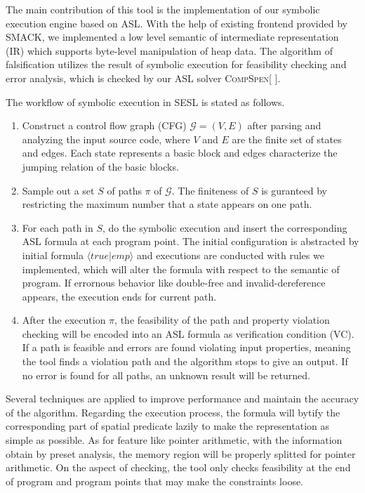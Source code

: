 \documentclass[runningheads]{llncs}
\newcommand{\lx}[1]{\color{teal}{LX: #1 :XL} \color{black}}
\begin{document}
The main contribution of this tool is the implementation of our symbolic execution engine based on ASL.
With the help of existing frontend provided by \textsc{SMACK}\cite{DBLP:conf/cav/RakamaricE14}, we implemented a low level semantic of intermediate representation (IR) which supports byte-level manipulation of heap data. 
The algorithm of falsification utilizes the result of symbolic execution for feasibility checking and error analysis, which is checked by our ASL solver \textsc{CompSpen}[\lx{CompSpen paper or website}]. 

The workflow of symbolic execution in \textsc{SESL} is stated as follows. 
\begin{enumerate}
\item Construct a control flow graph (CFG) $\mathcal{G} = (V, E)$ after parsing and analyzing the input source code, where $V$ and $E$ are the finite set of states and edges. Each state represents a basic block and edges characterize the jumping relation of the basic blocks.
\item Sample out a set $S$ of paths $\pi$ of $\mathcal{G}$. The finiteness of $S$ is guranteed by restricting the maximum number that a state appears on one path. 
\item For each path in $S$,  do the symbolic execution and insert the corresponding ASL formula at each program point. The initial configuration is abstracted by initial formula $\langle true| emp\rangle$ and executions are conducted with rules we implemented, which will alter the formula with respect to the semantic of program. If errornous behavior like double-free and invalid-dereference appears, the execution ends for current path.

\item After the execution $\pi$, the feasibility of the path and property violation checking will be encoded into an ASL formula as verification condition (VC). If a path is feasible and errors are found violating input properties, meaning the tool finds a violation path and the algorithm stops to give an output. If no error is found for all paths, an unknown result will be returned.
\end{enumerate}

Several techniques are applied to improve performance and maintain the accuracy of the algorithm.  Regarding the execution process, the formula will bytify the corresponding part of spatial predicate lazily to make the representation as simple as possible.
As for feature like pointer arithmetic, with the information obtain by preset analysis, the memory region will be properly splitted for pointer arithmetic.  
On the aspect of checking, the tool only checks feasibility at the end of program and program points that may make the constraints loose. 
\end{document}
